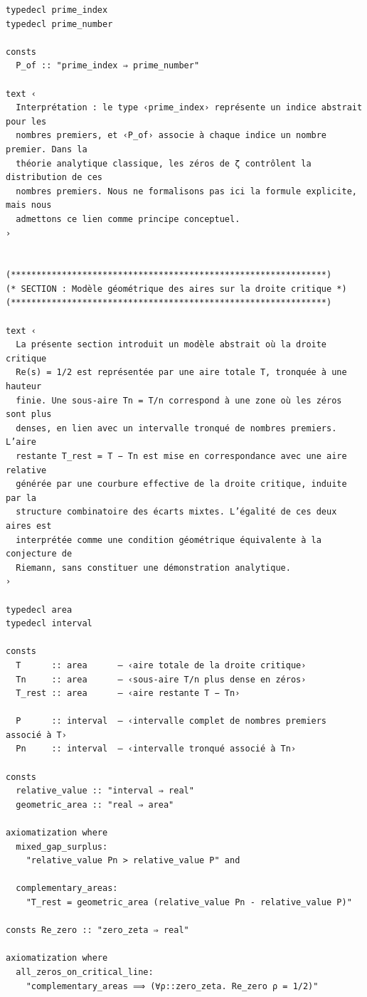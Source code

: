 \documentclass[a4paper,11pt]{article}
\begin{document}
\begin{holcode}[title={\textcolor{white}{Fichier : methode\_spectral.thy -- Partie 1/4}}]
\begin{lstlisting}
typedecl prime_index
typedecl prime_number

consts
  P_of :: "prime_index ⇒ prime_number"

text ‹
  Interprétation : le type ‹prime_index› représente un indice abstrait pour les
  nombres premiers, et ‹P_of› associe à chaque indice un nombre premier. Dans la
  théorie analytique classique, les zéros de ζ contrôlent la distribution de ces
  nombres premiers. Nous ne formalisons pas ici la formule explicite, mais nous
  admettons ce lien comme principe conceptuel.
›


(**************************************************************)
(* SECTION : Modèle géométrique des aires sur la droite critique *)
(**************************************************************)

text ‹
  La présente section introduit un modèle abstrait où la droite critique
  Re(s) = 1/2 est représentée par une aire totale T, tronquée à une hauteur
  finie. Une sous-aire Tn = T/n correspond à une zone où les zéros sont plus
  denses, en lien avec un intervalle tronqué de nombres premiers. L’aire
  restante T_rest = T − Tn est mise en correspondance avec une aire relative
  générée par une courbure effective de la droite critique, induite par la
  structure combinatoire des écarts mixtes. L’égalité de ces deux aires est
  interprétée comme une condition géométrique équivalente à la conjecture de
  Riemann, sans constituer une démonstration analytique.
›

typedecl area
typedecl interval

consts
  T      :: area      ― ‹aire totale de la droite critique›
  Tn     :: area      ― ‹sous-aire T/n plus dense en zéros›
  T_rest :: area      ― ‹aire restante T − Tn›

  P      :: interval  ― ‹intervalle complet de nombres premiers associé à T›
  Pn     :: interval  ― ‹intervalle tronqué associé à Tn›

consts
  relative_value :: "interval ⇒ real"
  geometric_area :: "real ⇒ area"

axiomatization where
  mixed_gap_surplus:
    "relative_value Pn > relative_value P" and

  complementary_areas:
    "T_rest = geometric_area (relative_value Pn - relative_value P)"

consts Re_zero :: "zero_zeta ⇒ real"

axiomatization where
  all_zeros_on_critical_line:
    "complementary_areas ⟹ (∀ρ::zero_zeta. Re_zero ρ = 1/2)"


\end{lstlisting}
\end{holcode}
\end{document}
